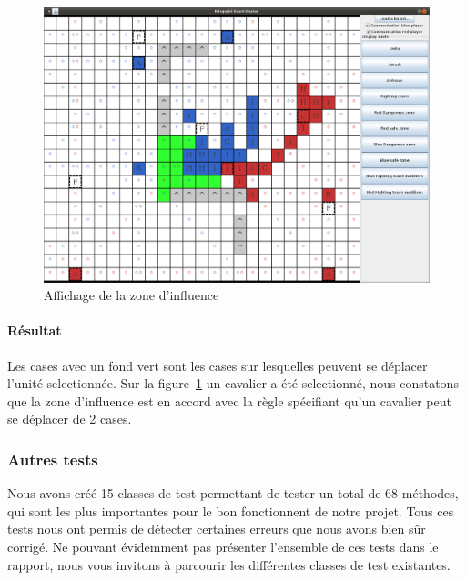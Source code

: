 				\begin{figure}[!h]
				    \caption{Affichage de la zone d'influence}
				    \centerline{\includegraphics[scale=0.35]{images/tests_fonctionnels/zone_influence.png}}
				    \label{fig:affichage_zone_influence}
				\end{figure}

				\paragraph{Résultat\\}
					Les cases avec un fond vert sont les cases sur lesquelles peuvent se déplacer l'unité selectionnée. Sur la figure~\ref{fig:affichage_zone_influence} un cavalier a été selectionné, nous constatons que la zone d'influence est en accord avec la règle spécifiant qu'un cavalier peut se déplacer de 2 cases. 
					
			\subsubsection{Autres tests}
			
				Nous avons créé 15 classes de test permettant de tester un total de 68 méthodes, qui sont les plus importantes pour le bon fonctionnent de notre projet.
				Tous ces tests nous ont permis de détecter certaines erreurs que nous avons bien sûr corrigé.
				Ne pouvant évidemment pas présenter l'ensemble de ces tests dans le rapport, nous vous invitons à parcourir les différentes classes de test existantes.
